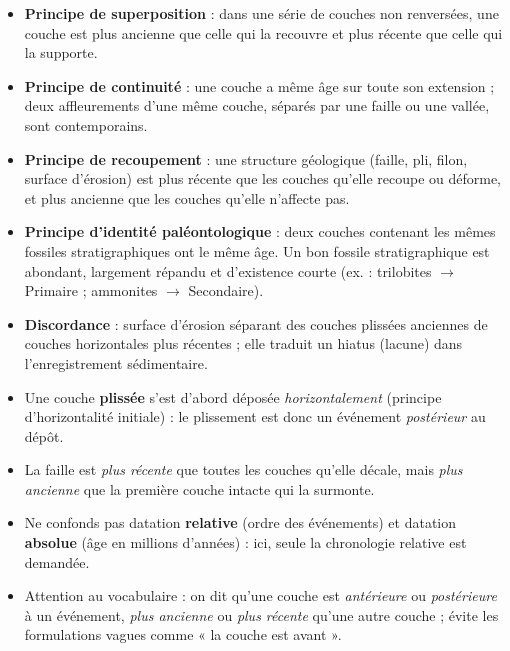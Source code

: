 \documentclass[11pt]{article}
\begin{document}
\begin{aretenir}
\begin{itemize}
\item \textbf{Principe de superposition} : dans une série de couches non renversées, une couche est plus ancienne que celle qui la recouvre et plus récente que celle qui la supporte.
\item \textbf{Principe de continuité} : une couche a même âge sur toute son extension ; deux affleurements d'une même couche, séparés par une faille ou une vallée, sont contemporains.
\item \textbf{Principe de recoupement} : une structure géologique (faille, pli, filon, surface d'érosion) est plus récente que les couches qu'elle recoupe ou déforme, et plus ancienne que les couches qu'elle n'affecte pas.
\item \textbf{Principe d'identité paléontologique} : deux couches contenant les mêmes fossiles stratigraphiques ont le même âge. Un bon fossile stratigraphique est abondant, largement répandu et d'existence courte (ex. : trilobites $\rightarrow$ Primaire ; ammonites $\rightarrow$ Secondaire).
\item \textbf{Discordance} : surface d'érosion séparant des couches plissées anciennes de couches horizontales plus récentes ; elle traduit un hiatus (lacune) dans l'enregistrement sédimentaire.
\end{itemize}
\end{aretenir}

\begin{attention}
\begin{itemize}
\item Une couche \textbf{plissée} s'est d'abord déposée \emph{horizontalement} (principe d'horizontalité initiale) : le plissement est donc un événement \emph{postérieur} au dépôt.
\item La faille est \emph{plus récente} que toutes les couches qu'elle décale, mais \emph{plus ancienne} que la première couche intacte qui la surmonte.
\item Ne confonds pas datation \textbf{relative} (ordre des événements) et datation \textbf{absolue} (âge en millions d'années) : ici, seule la chronologie relative est demandée.
\item Attention au vocabulaire : on dit qu'une couche est \emph{antérieure} ou \emph{postérieure} à un événement, \emph{plus ancienne} ou \emph{plus récente} qu'une autre couche ; évite les formulations vagues comme « la couche est avant ».
\end{itemize}
\end{attention}
\end{document}

